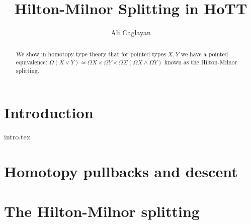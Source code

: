 \documentclass{article}
\title{Hilton-Milnor Splitting in HoTT}
\author{Ali Caglayan}
\newcommand{\loops}{\Omega}
\newcommand{\susp}{\Sigma}
\newcommand{\N}{\mathbb{N}}
\theoremstyle{definition}
\begin{document}
    
    \maketitle
    

    \begin{abstract}
        We show in homotopy type theory that for pointed types $X, Y$ we have a pointed equivalence:
        $\loops (X \vee Y) \simeq \loops X \times \loops Y \times \loops \susp (\loops X \wedge \loops Y)$
        known as the Hilton-Milnor splitting.
        \begin{comment}
         Observing that this can be iterated we can observe that:
            \begin{equation*}
                \loops \susp (X \vee Y) \simeq \loops \susp X \times \loops \susp Y \times \loops \susp
                    \left(
                        \bigvee_{i, j : \N} X^{\wedge i} \wedge Y^{\wedge j}
                    \right)
            \end{equation*}
        \end{comment}
    \end{abstract}

    \section{Introduction}

     {intro.tex}

    \section{Homotopy pullbacks and descent}
    
    
    
    \section{The Hilton-Milnor splitting}

    
\end{document}
